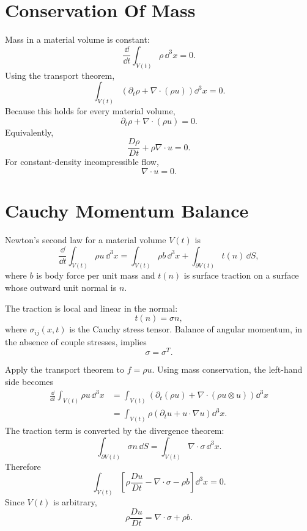\section{Conservation Of Mass}
\label{sec:mass-conservation}

Mass in a material volume is constant:
\[
  \frac{\dd}{\dd t}\int_{V(t)}\rho\,\dd^3x=0.
\]
Using the transport theorem,
\[
  \int_{V(t)}
  \left(
    \partial_t\rho+\nabla\cdot(\rho u)
  \right)\dd^3x=0.
\]
Because this holds for every material volume,
\[
  \boxed{
  \partial_t\rho+\nabla\cdot(\rho u)=0.
  }
\]
Equivalently,
\[
  \frac{D\rho}{Dt}+\rho\nabla\cdot u=0.
\]
For constant-density incompressible flow,
\[
  \boxed{\nabla\cdot u=0.}
\]

\section{Cauchy Momentum Balance}
\label{sec:cauchy-momentum}

Newton's second law for a material volume \(V(t)\) is
\[
  \frac{\dd}{\dd t}\int_{V(t)}\rho u\,\dd^3x
  =
  \int_{V(t)}\rho b\,\dd^3x
  +
  \int_{\partial V(t)} t(n)\,\dd S,
\]
where \(b\) is body force per unit mass and \(t(n)\) is surface traction on a
surface whose outward unit normal is \(n\).

\begin{assumption}
The traction is local and linear in the normal:
\[
  t(n)=\sigma n,
\]
where \(\sigma_{ij}(x,t)\) is the Cauchy stress tensor. Balance of angular
momentum, in the absence of couple stresses, implies
\[
  \sigma=\sigma^T.
\]
\end{assumption}

\begin{derivation}
Apply the transport theorem to \(f=\rho u\). Using mass conservation, the
left-hand side becomes
\[
\begin{aligned}
  \frac{\dd}{\dd t}\int_{V(t)}\rho u\,\dd^3x
  &=
  \int_{V(t)}
  \left(
    \partial_t(\rho u)+\nabla\cdot(\rho u\otimes u)
  \right)\dd^3x\\
  &=
  \int_{V(t)}
  \rho\left(\partial_tu+u\cdot\nabla u\right)\dd^3x.
\end{aligned}
\]
The traction term is converted by the divergence theorem:
\[
  \int_{\partial V(t)}\sigma n\,\dd S
  =
  \int_{V(t)}\nabla\cdot\sigma\,\dd^3x.
\]
Therefore
\[
  \int_{V(t)}
  \left[
    \rho\frac{D u}{D t}
    -
    \nabla\cdot\sigma
    -
    \rho b
  \right]\dd^3x=0.
\]
Since \(V(t)\) is arbitrary,
\[
  \boxed{
  \rho\frac{D u}{D t}=\nabla\cdot\sigma+\rho b.
  }
\]
\end{derivation}

